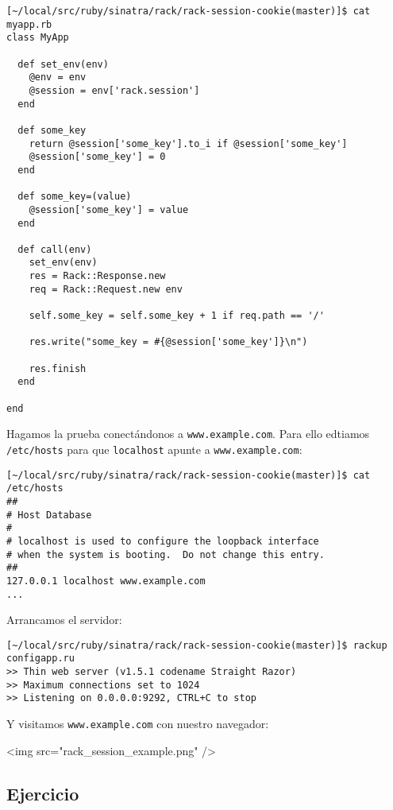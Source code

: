 \begin{verbatim}
[~/local/src/ruby/sinatra/rack/rack-session-cookie(master)]$ cat myapp.rb 
class MyApp

  def set_env(env)
    @env = env
    @session = env['rack.session']
  end

  def some_key 
    return @session['some_key'].to_i if @session['some_key']
    @session['some_key'] = 0
  end

  def some_key=(value)
    @session['some_key'] = value
  end

  def call(env)
    set_env(env)
    res = Rack::Response.new
    req = Rack::Request.new env

    self.some_key = self.some_key + 1 if req.path == '/'

    res.write("some_key = #{@session['some_key']}\n")

    res.finish
  end

end
\end{verbatim}

Hagamos la prueba conectándonos a \verb|www.example.com|. Para ello
edtiamos \verb|/etc/hosts| para que \verb|localhost| apunte a
\verb|www.example.com|:

\begin{verbatim}
[~/local/src/ruby/sinatra/rack/rack-session-cookie(master)]$ cat /etc/hosts
##
# Host Database
#
# localhost is used to configure the loopback interface
# when the system is booting.  Do not change this entry.
##
127.0.0.1 localhost www.example.com
...
\end{verbatim}

Arrancamos el servidor:

\begin{verbatim}
[~/local/src/ruby/sinatra/rack/rack-session-cookie(master)]$ rackup  configapp.ru 
>> Thin web server (v1.5.1 codename Straight Razor)
>> Maximum connections set to 1024
>> Listening on 0.0.0.0:9292, CTRL+C to stop
\end{verbatim}

Y visitamos \verb|www.example.com| con nuestro navegador:
\begin{rawhtml}
<img src="rack_session_example.png" />
\end{rawhtml}

\subsection{Ejercicio}

